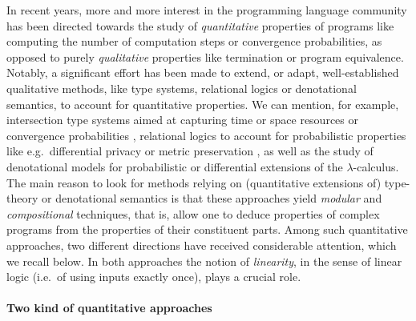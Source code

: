
In recent years, more and more interest in the programming language community has been directed towards the study of \emph{quantitative} properties of programs like computing the number of computation steps or convergence probabilities, 
as opposed to purely \emph{qualitative} properties like termination or program equivalence. 
Notably, a significant effort has been made to extend, or adapt, well-established qualitative methods, like type systems, relational logics or denotational semantics, to account for quantitative properties. We can mention, for example, 
intersection type systems aimed at capturing time or space resources \cite{decarvalho2018, Accattoli2022} or convergence probabilities \cite{Breuvart2018, PistoneLICS2022},  relational logics to account for probabilistic properties like e.g.~differential privacy \cite{Barthe_2012} or metric preservation \cite{Reed2010, dallago}, as well as the study of denotational models for 
probabilistic \cite{Ehrhard2011, Staton2017} or differential \cite{difflambda} extensions of the $\lambda$-calculus. 
The main reason to look for methods relying on (quantitative extensions of) type-theory or denotational semantics is that these approaches yield \emph{modular} and \emph{compositional} techniques, that is, allow one to deduce properties of complex programs from the properties of their constituent parts.   
Among such quantitative approaches, two different directions have received considerable attention, which we recall below.
In both approaches the notion of \emph{linearity}, in the sense of linear logic \cite{girardLl} (i.e.~of using inputs exactly once), plays a crucial role.

\paragraph*{Two kind of quantitative approaches}

